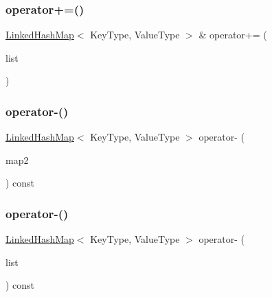 \mbox{\label{classLinkedHashMap_a7aa2b6c68b448ea09e21f0b662035d4c}} 
\subsubsection{\texorpdfstring{operator+=()}{operator+=()}\hspace{0.1cm}{\footnotesize\ttfamily [2/2]}}
{\footnotesize\ttfamily \mbox{\hyperlink{classLinkedHashMap}{Linked\+Hash\+Map}}$<$ Key\+Type, Value\+Type $>$ \& operator+= (\begin{DoxyParamCaption}\item[{std\+::initializer\+\_\+list$<$ std\+::pair$<$ Key\+Type, Value\+Type $>$ $>$}]{list }\end{DoxyParamCaption})}

\mbox{\label{classLinkedHashMap_aeb0ad54e8008a28ea0578ba8825a6e77}} 
\subsubsection{\texorpdfstring{operator-\/()}{operator-()}\hspace{0.1cm}{\footnotesize\ttfamily [1/2]}}
{\footnotesize\ttfamily \mbox{\hyperlink{classLinkedHashMap}{Linked\+Hash\+Map}}$<$ Key\+Type, Value\+Type $>$ operator-\/ (\begin{DoxyParamCaption}\item[{const \mbox{\hyperlink{classLinkedHashMap}{Linked\+Hash\+Map}}$<$ Key\+Type, Value\+Type $>$ \&}]{map2 }\end{DoxyParamCaption}) const}

\mbox{\label{classLinkedHashMap_a37609d0fc11658bfbe010c4f7c39c4b2}} 
\subsubsection{\texorpdfstring{operator-\/()}{operator-()}\hspace{0.1cm}{\footnotesize\ttfamily [2/2]}}
{\footnotesize\ttfamily \mbox{\hyperlink{classLinkedHashMap}{Linked\+Hash\+Map}}$<$ Key\+Type, Value\+Type $>$ operator-\/ (\begin{DoxyParamCaption}\item[{std\+::initializer\+\_\+list$<$ std\+::pair$<$ Key\+Type, Value\+Type $>$ $>$}]{list }\end{DoxyParamCaption}) const}


